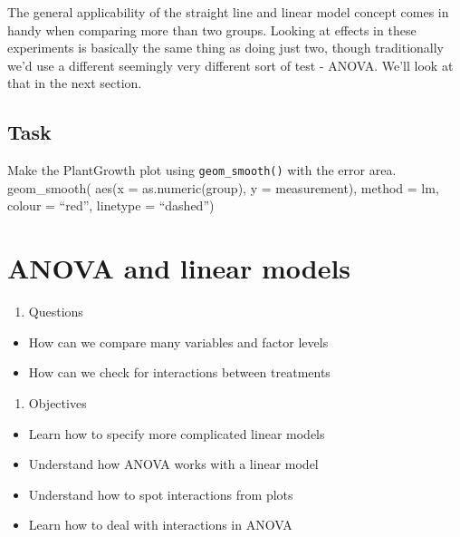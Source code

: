 \documentclass[
]{book}
\providecommand{\tightlist}{%
  \setlength{\itemsep}{0pt}\setlength{\parskip}{0pt}}
\begin{document}
The general applicability of the straight line and linear model concept comes in handy when comparing more than two groups. Looking at effects in these experiments is basically the same thing as doing just two, though traditionally we'd use a different seemingly very different sort of test - ANOVA. We'll look at that in the next section.

\hypertarget{task}{%
\section{Task}\label{task}}

Make the PlantGrowth plot using \texttt{geom\_smooth()} with the error area.
geom\_smooth( aes(x = as.numeric(group), y = measurement), method = lm, colour = ``red'', linetype = ``dashed'')

\hypertarget{anova-and-linear-models}{%
\chapter{ANOVA and linear models}\label{anova-and-linear-models}}

\begin{enumerate}
\def\labelenumi{\arabic{enumi}.}
\tightlist
\item
  Questions
\end{enumerate}

\begin{itemize}
\tightlist
\item
  How can we compare many variables and factor levels
\item
  How can we check for interactions between treatments
\end{itemize}

\begin{enumerate}
\def\labelenumi{\arabic{enumi}.}
\setcounter{enumi}{1}
\tightlist
\item
  Objectives
\end{enumerate}

\begin{itemize}
\tightlist
\item
  Learn how to specify more complicated linear models
\item
  Understand how ANOVA works with a linear model
\item
  Understand how to spot interactions from plots
\item
  Learn how to deal with interactions in ANOVA
\end{itemize}
\end{document}
